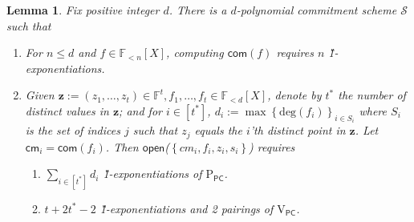\documentclass[11pt]{article} %
\newcommand{\z}{\ensuremath{\mathbf{z}}\xspace}
\newcommand{\F}{\ensuremath{\mathbb F}\xspace}
\newcommand{\com}{\ensuremath{\mathsf{com}}\xspace}
\newcommand{\cm}{\ensuremath{\mathsf{cm}}\xspace}
\newcommand{\open}{\ensuremath{\mathsf{open}}\xspace}
\renewcommand{\deg}{\ensuremath{\mathrm{deg}}\xspace}
\newcommand{\defeq}{:=}
\newcommand{\sett}[2]{\ensuremath{\set{#1}_{#2}}\xspace}
\newcommand{\prvpoly}{\ensuremath{\mathrm{P_{\mathsf{poly}}}}\xspace}
\newcommand{\prvpc}{\ensuremath{\mathrm{P_{\mathsf{PC}}}}\xspace}
\newcommand{\verpoly}{\ensuremath{\mathrm{V_{\mathsf{poly}}}}\xspace}
\newcommand{\verpc}{\ensuremath{\mathrm{V_{\mathsf{PC}}}}\xspace}
\newcommand{\set}[1]{\ensuremath{\left\{#1\right\}}\xspace}
\newcommand{\polysofdeg}[1]{\ensuremath{\F_{< #1}[X]}\xspace}
\newcommand{\PCscheme}{\ensuremath{\mathscr{S}}\xspace}
\newtheorem{lemma}{Lemma}[section]
\begin{document}
\begin{enumerate}
 \begin{lemma}\label{lem:kate}
 Fix positive integer $d$.
  There is a $d$-polynomial commitment scheme \PCscheme such that
  \begin{enumerate}
   \item For $n\leq d$ and $f\in \polysofdeg{n}$, computing $\com(f)$ requires $n$ \G1-exponentiations.
   \item Given $\z \defeq (z_1,\ldots,z_t)\in \F^t, f_1,\ldots, f_t \in \polysofdeg{d}$, denote by $t^*$ the number of distinct values in \z; and for $i\in [t^*]$, $d_i\defeq \max\sett{\deg(f_i)}{i\in S_i}$ where $S_i$ is the set of indices $j$ such that $z_j$ equals the $i$'th distinct point in \z.
   Let $\cm_i = \com(f_i)$.
   Then \open(\set{cm_i,f_i,z_i,s_i})  requires
   \begin{enumerate}
    \item $\sum_{i\in [t^*]} d_i$ \G1-exponentiations of \prvpc.
    \item $t+2t^*-2$ \G1-exponentiations and 2 pairings of \verpc.
    \end{enumerate}

   
  \end{enumerate}

 \end{lemma}


\end{enumerate}
% 
% 
% 
\end{document}
